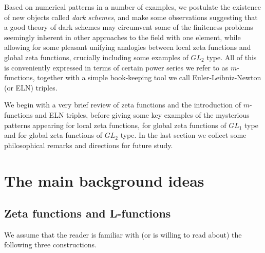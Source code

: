 \documentclass[paper=a4, fontsize=11pt]{scrartcl} %
\numberwithin{equation}{section} %
\numberwithin{figure}{section} %
\numberwithin{table}{section} %
\begin{document}
Based on numerical patterns in a number of examples, we postulate the existence of new objects called \emph{dark schemes}, and make some observations suggesting that a good theory of dark schemes may circumvent some of the finiteness problems seemingly inherent in other approaches to the field with one element, while allowing for some pleasant unifying analogies between local zeta functions and global zeta functions, crucially including some examples of $GL_2$ type. All of this is conveniently expressed in terms of certain power series we refer to as $m$-functions, together with a simple book-keeping tool we call Euler-Leibniz-Newton (or ELN) triples.

We begin with a very brief review of zeta functions and the introduction of $m$-functions and ELN triples, before giving some key examples of the mysterious patterns appearing for local zeta functions, for global zeta functions of $GL_1$ type and for global zeta functions of $GL_2$ type. In the last section we collect some philosophical remarks and directions for future study.

\section{The main background ideas}

\subsection{Zeta functions and L-functions}

We assume that the reader is familiar with (or is willing to read about) the following three constructions.
\end{document}
